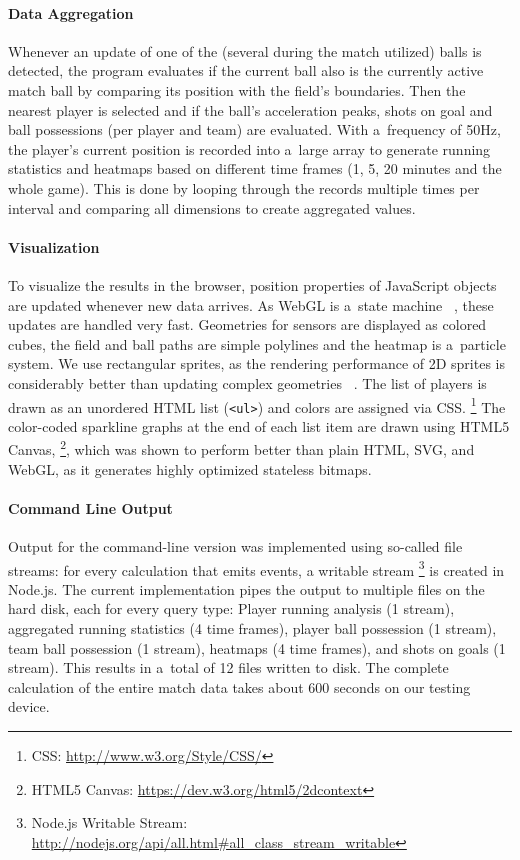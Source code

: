 \documentclass{sig-alternate}
\newcommand{\inlinelistingsize}{\fontsize{8pt}{11pt}}
\let\oldurl\url
\renewcommand{\url}[1]{\inlinelistingsize\oldurl{#1}}
\begin{document}
\paragraph{Data Aggregation}

Whenever an update of one of the (several during the match utilized) balls is detected,
the program evaluates if the current ball also is the currently active match ball
by comparing its position with the field's boundaries.
Then the nearest player is selected
and if the ball's acceleration peaks,
shots on goal and ball possessions
(per player and team) are evaluated.
With a~frequency of 50Hz, the player's current position
is recorded into a~large array to generate running statistics
and heatmaps based on different time frames
(1, 5, 20 minutes and the whole game).
This is done by looping through the records
multiple times per interval
and comparing all dimensions to create aggregated values.

\paragraph{Visualization}

To visualize the results in the browser,
position properties of JavaScript objects are updated
whenever new data arrives.
As WebGL is a~state machine%
~\cite{cantor2012webgl},
these updates are handled very fast.
Geometries for sensors are displayed as colored cubes,
the field and ball paths are simple polylines
and the heatmap is a~particle system.
We use rectangular sprites, as the rendering performance
of 2D sprites is considerably better than updating complex geometries%
~\cite{hoetzlein2012graphics}.
The list of players is drawn as an unordered HTML list (\texttt{<ul>})
and colors are assigned via CSS.%
\footnote{CSS: \url{http://www.w3.org/Style/CSS/}}
The color-coded sparkline graphs at the end of each list item
are drawn using HTML5 Canvas,%
\footnote{HTML5 Canvas: \url{https://dev.w3.org/html5/2dcontext}},
which was shown to perform better than plain HTML,
SVG, and WebGL, as it generates highly optimized stateless bitmaps.

\paragraph{Command Line Output}

Output for the command-line version was implemented
using so-called file streams: for every calculation that emits events,
a writable stream%
\footnote{Node.js Writable Stream: \url{http://nodejs.org/api/all.html\#all_class_stream_writable}}
is created in Node.js.
The current implementation pipes the output to multiple files
on the hard disk, each for every query type:
Player running analysis (1 stream),
aggregated running statistics (4 time frames),
player ball possession (1 stream),
team ball possession (1 stream),
heatmaps (4 time frames), and shots on goals (1 stream).
This results in a~total of 12 files written to disk.
The complete calculation of the entire match data
takes about 600 seconds on our testing device.
\end{document}
